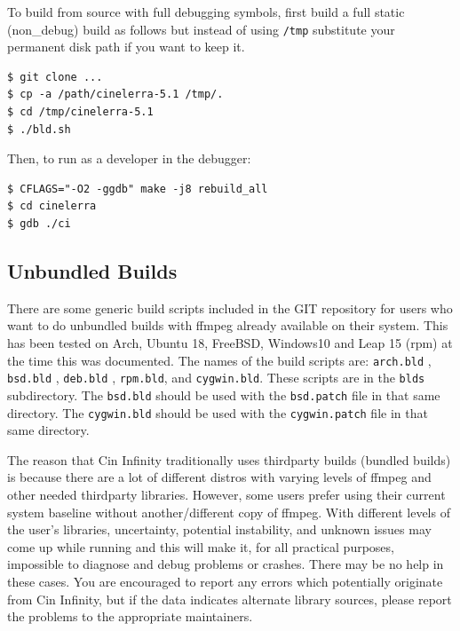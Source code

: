 To build from source with full debugging symbols, first build a full static (non\_debug) build as follows but instead of using \texttt{/tmp} substitute your permanent disk path if you want to keep it.

\begin{lstlisting}[numbers=none]
$ git clone ...
$ cp -a /path/cinelerra-5.1 /tmp/.
$ cd /tmp/cinelerra-5.1
$ ./bld.sh
\end{lstlisting}


Then, to run as a developer in the debugger:

\begin{lstlisting}[numbers=none]
$ CFLAGS="-O2 -ggdb" make -j8 rebuild_all
$ cd cinelerra
$ gdb ./ci
\end{lstlisting}


\subsection{Unbundled Builds}%
\label{sub:unbundled_builds}

There are some generic build scripts included in the \CGG{} GIT repository for users who want to do unbundled builds with ffmpeg already available on their system.  
This has been tested on Arch, Ubuntu 18, FreeBSD, Windows10 and Leap 15 (rpm) at the time this was documented.  
The names of the build scripts are:  \texttt{arch.bld} ,  \texttt{bsd.bld} , \texttt{deb.bld} , \texttt{rpm.bld}, and \texttt{cygwin.bld}.  
These scripts are in the \texttt{blds} subdirectory.  
The \texttt{bsd.bld} should be used with the \texttt{bsd.patch} file in that same directory.
The \texttt{cygwin.bld} should be used with the \texttt{cygwin.patch} file in that same directory.

The reason that Cin Infinity traditionally uses thirdparty builds (bundled builds) is because there are a lot of different distros with varying levels of ffmpeg and other needed thirdparty libraries.  
However, some users prefer using their current system baseline without another/different copy of ffmpeg.  
With different levels of the user’s libraries, uncertainty, potential instability, and unknown issues may come up while running \CGG{} and this will make it, for all practical purposes, impossible to diagnose and debug problems or crashes.  
There may be no help in these cases.  You are encouraged to report any errors which potentially originate from Cin Infinity, but if the data indicates alternate library sources, please report the problems to the appropriate maintainers.


